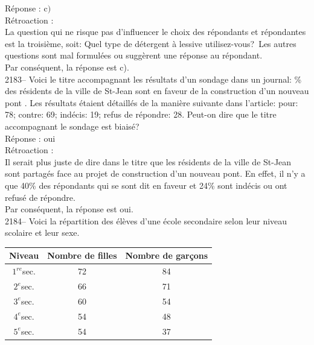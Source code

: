 \documentclass[letterpaper, 12pt]{article}
\begin{document}
R\'eponse : c$)$\\

R\'etroaction :\\
La question qui ne risque pas d'influencer le choix des r\'epondants et r\'epondantes est la troisi\`eme, soit: \og Quel type de d\'etergent \`a lessive utilisez-vous?\fg \, Les autres questions sont mal formul\'ees ou sugg\`erent une r\'eponse au r\'epondant.\\
Par cons\'equent, la r\'eponse est c).\\

2183-- Voici le titre accompagnant les r\'esultats d'un sondage dans un journal: \% des r\'esidents de la ville de St-Jean sont en faveur de la construction d'un nouveau pont \fg. Les r\'esultats \'etaient d\'etaill\'es de la mani\`ere suivante dans l'article: pour: 78; contre: 69; ind\'ecis: 19; refus de r\'epondre: 28. Peut-on dire que le titre accompagnant le sondage est biais\'e?\\

R\'eponse : oui\\

R\'etroaction :\\
Il serait plus juste de dire dans le titre que les r\'esidents de la ville de St-Jean sont partag\'es face au projet de construction d'un nouveau pont. En effet, il n'y a que 40\% des r\'epondants qui se sont dit en faveur et 24\% sont ind\'ecis ou ont refus\'e de r\'epondre. \\
Par cons\'equent, la r\'eponse est oui.\\


2184-- Voici la r\'epartition des \'el\`eves d'une \'ecole secondaire selon leur niveau scolaire et leur sexe.\\
\begin{center}
 \begin{tabular}{|c|c|c|}\hline
 Niveau & Nombre de filles & Nombre de gar\c cons \\ \hline\hline
$1^{re}$sec. & 72 & 84 \\ \hline
$2^{e}$sec. & 66 & 71 \\ \hline
$3^{e}$sec. & 60 & 54 \\ \hline
$4^{e}$sec. & 54 & 48 \\ \hline
$5^{e}$sec. & 54 & 37 \\ \hline
\end{tabular}
\end{center}
\end{document}

